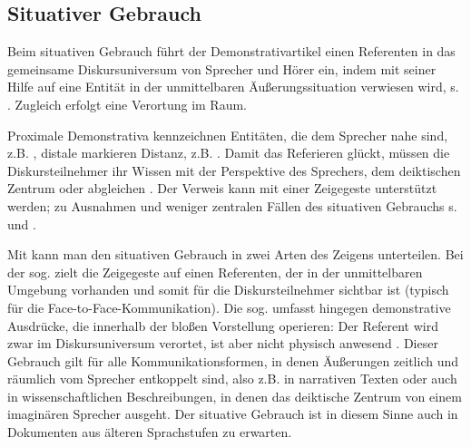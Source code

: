 \subsection{Situativer Gebrauch}\label{sec:situativ}

Beim situativen Gebrauch \parencite[auch deiktischer Gebrauch, z.B. bei][]{Bisle-Muller1991,Consten2004,Studler2011} führt der Demonstrativartikel einen Referenten in das gemeinsame Diskursuniversum von Sprecher und Hörer ein, indem mit seiner Hilfe auf eine Entität in der unmittelbaren Äußerungssituation verwiesen wird, s. . Zugleich erfolgt eine Verortung im Raum.

\begin{exe}
	\ex \label{ex:deikt} 
\end{exe}

Proximale Demonstrativa kennzeichnen Entitäten, die dem Sprecher nahe sind, z.B. , distale markieren Distanz, z.B. .
Damit das Referieren glückt, müssen die Diskursteilnehmer ihr Wissen mit der Perspektive des Sprechers, dem deiktischen Zentrum oder   \parencite{Buhler1934} abgleichen  \parencite[s. auch][327ff.]{Hoffmann2009}. Der Verweis kann mit einer Zeigegeste unterstützt werden; zu Ausnahmen und weniger zentralen Fällen des situativen Gebrauchs s. \textcite[S. 94f.]{Diessel1999} und \textcite[219-224]{Himmelmann1996}. 

Mit \textcite[]{Buhler1934} kann man den situativen Gebrauch in zwei Arten des Zeigens unterteilen. Bei der sog.  zielt die Zeigegeste auf einen Referenten, der in der unmittelbaren Umgebung vorhanden und somit für die Diskursteilnehmer sichtbar ist (typisch für die Face-to-Face-Kommunikation). Die sog.  umfasst hingegen demonstrative Ausdrücke, die innerhalb der bloßen Vorstellung operieren: Der Referent wird zwar im Diskursuniversum verortet, ist aber nicht physisch anwesend \parencite[s. auch][222]{Himmelmann1996}. Dieser Gebrauch gilt für alle Kommunikationsformen, in denen Äußerungen zeitlich und räumlich vom Sprecher entkoppelt sind, also z.B. in narrativen Texten \parencite[95]{Diessel1999} oder auch in wissenschaftlichen Beschreibungen, in denen das deiktische Zentrum von einem imaginären Sprecher ausgeht. Der situative Gebrauch ist in diesem Sinne auch in Dokumenten aus älteren Sprachstufen zu erwarten. 

